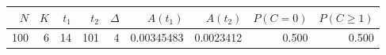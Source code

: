 \begin{tabular}{r r r r r r r r r}
\toprule
$N$ & $K$ & $t_1$ & $t_2$ & $\Delta$ & $A(t_1)$ & $A(t_2)$ & $P(C=0)$ & $P(C\ge1)$ \\
\midrule
100 & 6 & 14 & 101 & 4 & 0.00345483 & 0.0023412 & 0.500 & 0.500 \\
\bottomrule
\end{tabular}
